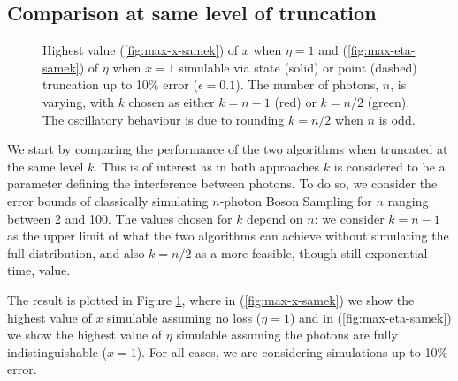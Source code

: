 \subsection{Comparison at same level of truncation}
\label{subsec:same-k}

\begin{figure}
\hfill
{}
\caption[Highest value of $x$ and $\eta$ simulable via state or point truncation]{\label{fig:samek} 
Highest value (\ref{fig:max-x-samek}) of $x$ when $\eta=1$ and (\ref{fig:max-eta-samek}) of $\eta$ when $x=1$ simulable via state (solid) or point (dashed) truncation up to 10\% error ($\epsilon=0.1$). 
The number of photons, $n$, is varying, with $k$ chosen as either $k=n-1$ (red) or $k=n/2$ (green).
The oscillatory behaviour is due to rounding $k=n/2$ when $n$ is odd.}
\end{figure}

We start by comparing the performance of the two algorithms when truncated at the same level $k$. 
This is of interest as in both approaches $k$ is considered to be a parameter defining the interference between photons. 
To do so, we consider the error bounds of classically simulating $n$-photon Boson Sampling for $n$ ranging between 2 and 100. 
The values chosen for $k$ depend on $n$: we consider $k=n-1$ as the upper limit of what the two algorithms can achieve without simulating the full distribution, and also $k=n/2$ as a more feasible, though still exponential time, value.

The result is plotted in Figure \ref{fig:samek}, where in (\ref{fig:max-x-samek}) we show the highest value of $x$ simulable assuming no loss ($\eta=1$) and in (\ref{fig:max-eta-samek}) we show the highest value of $\eta$ simulable assuming the photons are fully indistinguishable ($x=1$). 
For all cases, we are considering simulations up to 10\% error.

